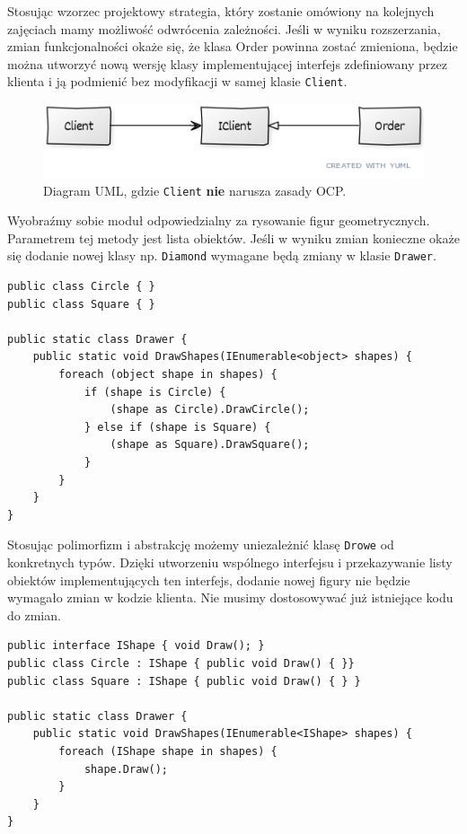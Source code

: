 Stosując wzorzec projektowy strategia, który zostanie omówiony na kolejnych zajęciach mamy możliwość odwrócenia zależności. Jeśli w wyniku rozszerzania, zmian funkcjonalności okaże się, że klasa Order powinna zostać zmieniona, będzie można utworzyć nową wersję klasy implementującej interfejs zdefiniowany przez klienta i ją podmienić bez modyfikacji w samej klasie \texttt{Client}.

\begin{figure}[hbt!]
	\centering
	\includegraphics[width=0.9\linewidth]{images/SolidOcpUml}
	\caption{Diagram UML, gdzie \texttt{Client} \textbf{nie} narusza zasady OCP.}
	\label{lab1/fig/SolidOcpUml}
\end{figure}

Wyobraźmy sobie moduł odpowiedzialny za rysowanie figur geometrycznych. Parametrem tej metody jest lista obiektów. Jeśli w wyniku zmian konieczne okaże się dodanie nowej klasy np. \texttt{Diamond} wymagane będą zmiany w klasie \texttt{Drawer}.
\begin{lstlisting}[caption={Naruszenie zasady OCP}, label={lab1/lst/ocpViolationShapes}]
public class Circle { }
public class Square { }

public static class Drawer {
	public static void DrawShapes(IEnumerable<object> shapes) {
		foreach (object shape in shapes) {
			if (shape is Circle) {
				(shape as Circle).DrawCircle();
			} else if (shape is Square) {
				(shape as Square).DrawSquare();
			}
		}
	}
}
\end{lstlisting}

Stosując polimorfizm i abstrakcję możemy uniezależnić klasę \texttt{Drowe} od konkretnych typów. Dzięki utworzeniu wspólnego interfejsu i przekazywanie listy obiektów implementujących ten interfejs, dodanie nowej figury nie będzie wymagało zmian w kodzie klienta. Nie musimy dostosowywać już istniejące kodu do zmian.

\begin{lstlisting}[caption={Naruszenie zasady OCP}, label={lab1/lst/ocpViolationShapes}]
public interface IShape { void Draw(); }
public class Circle : IShape { public void Draw() { }}
public class Square : IShape { public void Draw() { } }

public static class Drawer {
	public static void DrawShapes(IEnumerable<IShape> shapes) {
		foreach (IShape shape in shapes) {
			shape.Draw();
		}
	}
}
\end{lstlisting}

